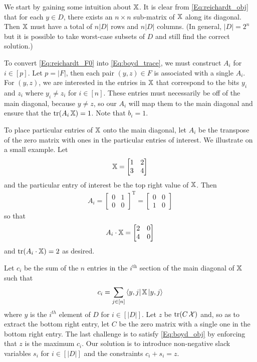 We start by gaining some intuition about $\operatorname{\mathbb{X}}$.
It is clear from \cref{Eq:reichardt_obj} that for 
each $y \in D$, there exists an $n \times n$ sub-matrix of $\operatorname{\mathbb{X}}$ along its diagonal.
Then $\operatorname{\mathbb{X}}$ must have a total of $n|D|$ rows and $n|D|$ columns.
(In general, $|D| = 2^n$ but it is possible to take 
worst-case subsets of $D$ and still find the correct solution.)

To convert \cref{Eq:reichardt_F0} into \cref{Eq:boyd_trace},
we must construct $A_i$ for $i \in [p]$.
Let $p = |F|$, then each pair $(y,z) \in F$
is associated with a single $A_i$.
For $(y,z)$, we are interested in the entries
in $\operatorname{\mathbb{X}}$ that correspond to the bits $y_i$ and $z_i$
where $y_i \neq z_i$ for $i \in [n]$.
These entries must necessarily be off of the main diagonal,
because $y\neq z$,
so our $A_i$ will map them to the main diagonal 
and ensure that the $\operatorname{\text{tr}}(A_i \operatorname{\mathbb{X}})=1$.
Note that $b_i = 1$.

To place particular entries of $\operatorname{\mathbb{X}}$ onto the main diagonal,
let $A_i$ be the transpose of the zero matrix with
ones in the particular entries of interest.
We illustrate on a small example.
Let
\begin{align}
    \operatorname{\mathbb{X}} = \left[ \begin{matrix} 1 & 2 \\ 3 & 4 \end{matrix} \right] \nonumber
\end{align}
and the particular entry of interest be the top right value of $\operatorname{\mathbb{X}}$.
Then
\begin{align}
    A_i = \left[ \begin{matrix} 0 & 1 \\ 0 & 0 \end{matrix} \right]^\textrm{T} \nonumber
    = \left[ \begin{matrix} 0 & 0 \\ 1 & 0 \end{matrix} \right] \nonumber
\end{align}
so that
\begin{align}
    A_i \cdot \operatorname{\mathbb{X}} = \left[ \begin{matrix} 2 & 0 \\ 4 & 0 \end{matrix} \right] \nonumber
\end{align}
and $\operatorname{\text{tr}}(A_i \cdot \operatorname{\mathbb{X}}) = 2$ as desired.

Let $c_i$ be the sum of the $n$ entries
in the $i^\mathrm{th}$ section of the main diagonal of $\operatorname{\mathbb{X}}$
such that
\begin{align}
    c_i = \sum_{j \in [n]} \bra{y,j}\operatorname{\mathbb{X}}\ket{y,j}
    \nonumber
\end{align} 
where $y$ is the $i^{th}$ element of $D$ for
$i \in [|D|]$.
Let $z$ be $\operatorname{\text{tr}}(C\operatorname{\mathcal{X}})$ and, so as to extract the bottom right entry,
let $C$ be the zero matrix with a single one in the bottom right entry.
The last challenge is to satisfy \cref{Eq:boyd_obj}
by enforcing that $z$ is the maximum $c_i$.
Our solution is to introduce non-negative slack variables
$s_i$ for $i \in [|D|]$ and the constraints
$c_i + s_i = z$.


